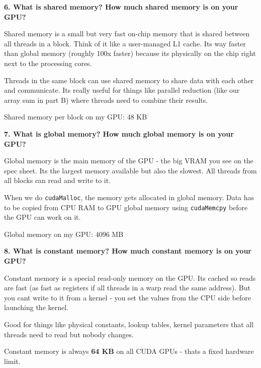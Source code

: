 \documentclass[12pt]{article}
\begin{document}
\textbf{6. What is shared memory? How much shared memory is on your GPU?}

\vspace{0.3cm}

Shared memory is a small but very fast on-chip memory that is shared between all threads in a block. Think of it like a user-managed L1 cache. Its way faster than global memory (roughly 100x faster) because its physically on the chip right next to the processing cores.

Threads in the same block can use shared memory to share data with each other and communicate. Its really useful for things like parallel reduction (like our array sum in part B) where threads need to combine their results.

Shared memory per block on my GPU: 48 KB

\vspace{0.5cm}

\textbf{7. What is global memory? How much global memory is on your GPU?}

\vspace{0.3cm}

Global memory is the main memory of the GPU - the big VRAM you see on the spec sheet. Its the largest memory available but also the slowest. All threads from all blocks can read and write to it.

When we do \texttt{cudaMalloc}, the memory gets allocated in global memory. Data has to be copied from CPU RAM to GPU global memory using \texttt{cudaMemcpy} before the GPU can work on it.

Global memory on my GPU: 4096 MB

\vspace{0.5cm}

\textbf{8. What is constant memory? How much constant memory is on your GPU?}

\vspace{0.3cm}

Constant memory is a special read-only memory on the GPU. Its cached so reads are fast (as fast as registers if all threads in a warp read the same address). But you cant write to it from a kernel - you set the values from the CPU side before launching the kernel.

Good for things like physical constants, lookup tables, kernel parameters that all threads need to read but nobody changes.

Constant memory is always \textbf{64 KB} on all CUDA GPUs - thats a fixed hardware limit.
\end{document}
